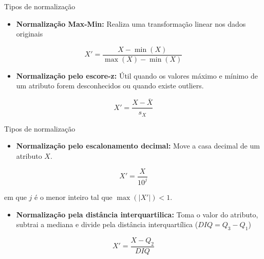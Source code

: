 \documentclass[
  ignorenonframetext,
  aspectratio=169,
]{beamer}
\providecommand{\tightlist}{%
  \setlength{\itemsep}{0pt}\setlength{\parskip}{0pt}}
\begin{document}
\begin{frame}{Tipos de normalização}
\label{tipos-de-normalizauxe7uxe3o}
\begin{itemize}
\tightlist
\item
  \textbf{Normalização Max-Min:} Realiza uma transformação linear nos
  dados originais
\end{itemize}

\[X' = \dfrac{X - \min(X)}{\max(X) - \min(X)}\]

\pause

\begin{itemize}
\tightlist
\item
  \textbf{Normalização pelo escore-z:} Útil quando os valores máximo e
  mínimo de um atributo forem desconhecidos ou quando existe outliers.
\end{itemize}

\[X' = \dfrac{X - \bar{X}}{s_X}\]
\end{frame}

\begin{frame}{Tipos de normalização}
\label{tipos-de-normalizauxe7uxe3o-1}
\begin{itemize}
\tightlist
\item
  \textbf{Normalização pelo escalonamento decimal:} Move a casa decimal
  de um atributo \(X\).
\end{itemize}

\[X' = \dfrac{X}{10^j}\]

em que \(j\) é o menor inteiro tal que \(\max(|X'|)< 1\).

\pause

\begin{itemize}
\tightlist
\item
  \textbf{Normalização pela distância interquartilica:} Toma o valor do
  atributo, subtrai a mediana e divide pela distância interquartílica
  (\(DIQ = Q_3 - Q_1\))
\end{itemize}

\[X' =  \dfrac{X - Q_2}{DIQ}\]
\end{frame}
\end{document}
